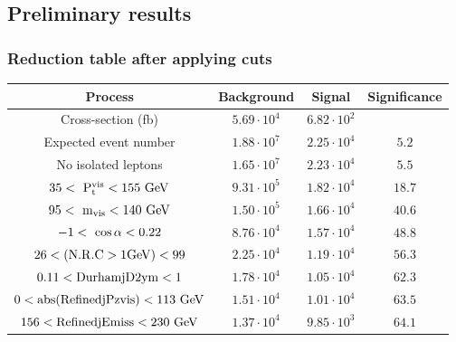 \documentclass{beamer}
\begin{document}
\subsection{Preliminary results}
\begin{frame}
    \frametitle{Reduction table after applying cuts}

    \hspace{-0.7cm}
    \centering 
    \footnotesize{ 
                \begin{tabular}{c c c c}
      \hline
      Process                                     & Background          & Signal              & Significance  \tabularnewline
      \hline
      \hline
      Cross-section (fb)                          & $5.69 \cdot 10^{4}$ & $6.82 \cdot 10^{2}$ &               \tabularnewline
      \hline
      Expected event number                       & $1.88 \cdot 10^{7}$ & $2.25 \cdot 10^{4}$ & $5.2$         \tabularnewline
      No isolated leptons                         & $1.65 \cdot 10^{7}$ & $2.23 \cdot 10^{4}$ & $5.5$         \tabularnewline
      {$35 <~\rm{{P}_{t}^{vis}} < 155~\rm{GeV} $} & $9.31 \cdot 10^{5}$ & $1.82 \cdot 10^{4}$ & $18.7$        \tabularnewline
      {$95 <~\rm{m_{vis}}< 140~\rm{GeV}$}         & $1.50 \cdot 10^{5}$ & $1.66 \cdot 10^{4}$ & $40.6$        \tabularnewline
      {$-1 <~\rm{\cos{\alpha}}< 0.22$}            & $8.76 \cdot 10^{4}$ & $1.57 \cdot 10^{4}$ & $48.8$        \tabularnewline
      $26 < (\rm{N.R.C > 1GeV}) < 99$             & $2.25 \cdot 10^{4}$ & $1.19 \cdot 10^{4}$ & $56.3$        \tabularnewline
      $0.11 < \rm{DurhamjD2ym} < 1$               & $1.78 \cdot 10^{4}$ & $1.05 \cdot 10^{4}$ & $62.3$        \tabularnewline
      $0 < \rm{abs(RefinedjPzvis)} < 113~\rm{GeV}$& $1.51 \cdot 10^{4}$ & $1.01 \cdot 10^{4}$ & $63.5$        \tabularnewline
      $156 < \rm{RefinedjEmiss} < 230~\rm{GeV}$   & $1.37 \cdot 10^{4}$ & $9.85 \cdot 10^{3}$ & $64.1$        \tabularnewline      
      \hline %
    \end{tabular}
   }
\end{frame}
\end{document}
